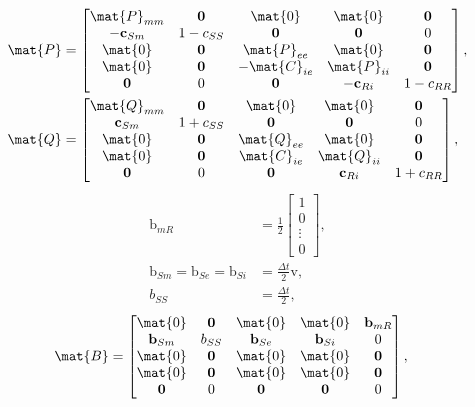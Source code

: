 \documentclass{jpmarticle}
\renewcommand{\vec}[1]{\boldsymbol{\mathrm{#1}}}
\begin{document}
\begin{equation}
  \begin{split}
    \mat{P} &=
    \begin{bmatrix}
      \mat{P}_{mm} & \vec{0} & \mat{0} & \mat{0} & \vec{0}
      \\
      - \vec{c}_{Sm} & 1 - c_{SS} & \vec{0} & \vec{0} & 0
      \\
      \mat{0} & \vec{0} & \mat{P}_{ee} & \mat{0} & \vec{0}
      \\
      \mat{0} & \vec{0} & - \mat{C}_{ie} & \mat{P}_{ii} & \vec{0}
      \\
      \vec{0} & 0 & \vec{0} & - \vec{c}_{Ri} & 1 - c_{RR}
    \end{bmatrix},
    \\
    \mat{Q} &=
    \begin{bmatrix}
      \mat{Q}_{mm} & \vec{0} & \mat{0} & \mat{0} & \vec{0}
      \\
      \vec{c}_{Sm} & 1 + c_{SS} & \vec{0} & \vec{0} & 0
      \\
      \mat{0} & \vec{0} & \mat{Q}_{ee} & \mat{0} & \vec{0}
      \\
      \mat{0} & \vec{0} & \mat{C}_{ie} & \mat{Q}_{ii} & \vec{0}
      \\
      \vec{0} & 0 & \vec{0} & \vec{c}_{Ri} & 1 + c_{RR}
    \end{bmatrix},
  \end{split}
\end{equation}
\begin{equation}
  \begin{split}
    \vec{b}_{mR} &=
    \frac{1}{2}
    \begin{bmatrix}
      1 \\ 0 \\ \vdots \\ 0
    \end{bmatrix},
    \\
    \vec{b}_{Sm} =
    \vec{b}_{Se} =
    \vec{b}_{Si} &=
    \frac{\Delta t}{2} \vec{v},
    \\
    b_{SS} &=
    \frac{\Delta t}{2},
  \end{split}
\end{equation}
\begin{equation}
  \begin{split}
    \mat{B} &=
    \begin{bmatrix}
      \mat{0} & \vec{0} & \mat{0} & \mat{0} & \vec{b}_{mR}
      \\
      \vec{b}_{Sm} & b_{SS} & \vec{b}_{Se} & \vec{b}_{Si} & 0
      \\
      \mat{0} & \vec{0} & \mat{0} & \mat{0} & \vec{0}
      \\
      \mat{0} & \vec{0} & \mat{0} & \mat{0} & \vec{0}
      \\
      \vec{0} & 0 & \vec{0} & \vec{0} & 0
    \end{bmatrix},
  \end{split}
\end{equation}
\end{document}
